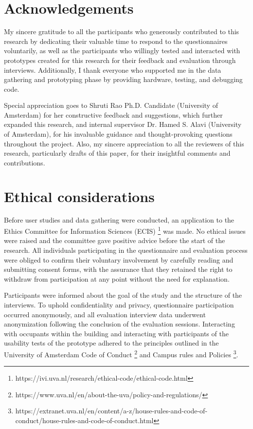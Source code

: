 \onecolumn

\appendix
\begin{appendices}

\section{Acknowledgements}
\label{appendix:acknowledgements}

My sincere gratitude to all the participants who generously contributed to this research by dedicating their valuable time to respond to the questionnaires voluntarily, as well as the participants who willingly tested and interacted with prototypes created for this research for their feedback and evaluation through interviews. Additionally, I thank everyone who supported me in the data gathering and prototyping phase by providing hardware, testing, and debugging code.

Special appreciation goes to Shruti Rao Ph.D. Candidate (University of Amsterdam) for her constructive feedback and suggestions, which further expanded this research, and internal supervisor Dr. Hamed S. Alavi (University of Amsterdam), for his invaluable guidance and thought-provoking questions throughout the project. Also, my sincere appreciation to all the reviewers of this research, particularly drafts of this paper, for their insightful comments and contributions.

\section{Ethical considerations}
\label{appendix:ethical}

Before user studies and data gathering were conducted, an application to the Ethics Committee for Information Sciences (ECIS) \footnote{https://ivi.uva.nl/research/ethical-code/ethical-code.html} was made. No ethical issues were raised and the committee gave positive advice before the start of the research. All individuals participating in the questionnaire and evaluation process were obliged to confirm their voluntary involvement by carefully reading and submitting consent forms, with the assurance that they retained the right to withdraw from participation at any point without the need for explanation.

Participants were informed about the goal of the study and the structure of the interviews. To uphold confidentiality and privacy, questionnaire participation occurred anonymously, and all evaluation interview data underwent anonymization following the conclusion of the evaluation sessions. Interacting with occupants within the building and interacting with participants of the usability tests of the prototype adhered to the principles outlined in the University of Amsterdam Code of Conduct \footnote{https://www.uva.nl/en/about-the-uva/policy-and-regulations/} and Campus rules and Policies \footnote{https://extranet.uva.nl/en/content/a-z/house-rules-and-code-of-conduct/house-rules-and-code-of-conduct.html}.


\end{appendices}
